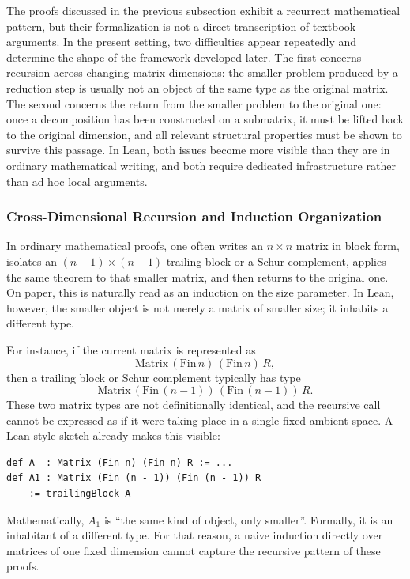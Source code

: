 \documentclass[pdflatex,sn-mathphys-num]{sn-jnl}%
\theoremstyle{thmstyleone}%
\theoremstyle{thmstyletwo}%
\theoremstyle{thmstylethree}%
\begin{document}
The proofs discussed in the previous subsection exhibit a recurrent mathematical pattern, but their formalization is not a direct transcription of textbook arguments. In the present setting, two difficulties appear repeatedly and determine the shape of the framework developed later. The first concerns recursion across changing matrix dimensions: the smaller problem produced by a reduction step is usually not an object of the same type as the original matrix. The second concerns the return from the smaller problem to the original one: once a decomposition has been constructed on a submatrix, it must be lifted back to the original dimension, and all relevant structural properties must be shown to survive this passage. In Lean, both issues become more visible than they are in ordinary mathematical writing, and both require dedicated infrastructure rather than ad hoc local arguments.

\subsubsection{Cross-Dimensional Recursion and Induction Organization}

In ordinary mathematical proofs, one often writes an $n\times n$ matrix in block form, isolates an $(n-1)\times(n-1)$ trailing block or a Schur complement, applies the same theorem to that smaller matrix, and then returns to the original one. On paper, this is naturally read as an induction on the size parameter. In Lean, however, the smaller object is not merely a matrix of smaller size; it inhabits a different type.

For instance, if the current matrix is represented as
\[
\mathrm{Matrix}\,(\mathrm{Fin}\,n)\,(\mathrm{Fin}\,n)\,R,
\]
then a trailing block or Schur complement typically has type
\[
\mathrm{Matrix}\,(\mathrm{Fin}\,(n-1))\,(\mathrm{Fin}\,(n-1))\,R.
\]
These two matrix types are not definitionally identical, and the recursive call cannot be expressed as if it were taking place in a single fixed ambient space. A Lean-style sketch already makes this visible:

\begin{lstlisting}
def A  : Matrix (Fin n) (Fin n) R := ...
def A1 : Matrix (Fin (n - 1)) (Fin (n - 1)) R 
    := trailingBlock A
\end{lstlisting}

Mathematically, $A_1$ is ``the same kind of object, only smaller''. Formally, it is an inhabitant of a different type. For that reason, a naive induction directly over matrices of one fixed dimension cannot capture the recursive pattern of these proofs.
\end{document}
